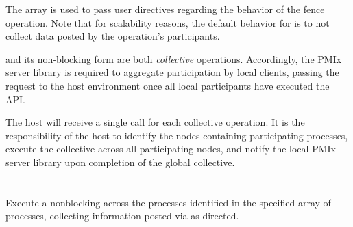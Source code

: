 The  array is used to pass user directives regarding the behavior of the fence operation. Note that for scalability reasons, the default behavior for  is to not collect data posted by the operation's participants.

\adviceimplstart
{} and its non-blocking form are both \emph{collective} operations. Accordingly, the \ac{PMIx} server library is required to aggregate participation by local clients, passing the request to the host environment once all local participants have executed the \ac{API}.
\adviceimplend

\advicermstart
The host will receive a single call for each collective operation. It is the responsibility of the host to identify the nodes containing participating processes, execute the collective across all participating nodes, and notify the local \ac{PMIx} server library upon completion of the global collective.
\advicermend


\section{}

\summary

Execute a nonblocking  across the processes identified in the specified array of processes, collecting information posted via  as directed.

\format


\begin{arglist}
\end{arglist}

